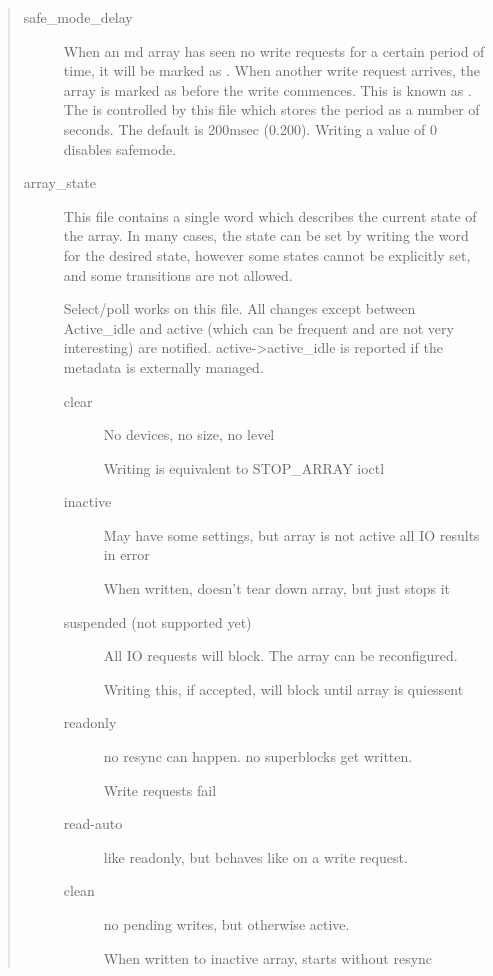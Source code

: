 \documentclass[a4paper,8pt,english]{sphinxmanual}
\begin{document}
\begin{quote}
\begin{description}
\item[{safe\_mode\_delay}] \leavevmode
When an md array has seen no write requests for a certain period
of time, it will be marked as .  When another write
request arrives, the array is marked as  before the write
commences.  This is known as .
The  is controlled by this file which stores the
period as a number of seconds.  The default is 200msec (0.200).
Writing a value of 0 disables safemode.

\item[{array\_state}] \leavevmode
This file contains a single word which describes the current
state of the array.  In many cases, the state can be set by
writing the word for the desired state, however some states
cannot be explicitly set, and some transitions are not allowed.

Select/poll works on this file.  All changes except between
Active\_idle and active (which can be frequent and are not
very interesting) are notified.  active-\textgreater{}active\_idle is
reported if the metadata is externally managed.
\begin{description}
\item[{clear}] \leavevmode
No devices, no size, no level

Writing is equivalent to STOP\_ARRAY ioctl

\item[{inactive}] \leavevmode
May have some settings, but array is not active
all IO results in error

When written, doesn't tear down array, but just stops it

\item[{suspended (not supported yet)}] \leavevmode
All IO requests will block. The array can be reconfigured.

Writing this, if accepted, will block until array is quiessent

\item[{readonly}] \leavevmode
no resync can happen.  no superblocks get written.

Write requests fail

\item[{read-auto}] \leavevmode
like readonly, but behaves like  on a write request.

\item[{clean}] \leavevmode
no pending writes, but otherwise active.

When written to inactive array, starts without resync


\end{description}
\end{description}
\end{quote}
\end{document}

